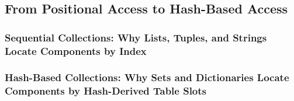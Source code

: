 \subsection{From Positional Access to Hash-Based Access}
\subsubsection{Sequential Collections: Why Lists, Tuples, and Strings Locate Components by Index}
\subsubsection{Hash-Based Collections: Why Sets and Dictionaries Locate Components by Hash-Derived Table Slots}
